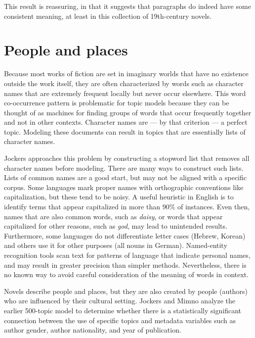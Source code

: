This result is reassuring, in that it suggests that paragraphs do indeed have some consistent meaning, at least in this collection of 19th-century novels.


\section{People and places}

Because most works of fiction are set in imaginary worlds that have no existence outside the work itself, they are often characterized by words such as character names that are extremely frequent locally but never occur elsewhere. 
This word co-occurrence pattern is problematic for topic models because they can be thought of as machines for finding groups of words that occur frequently together and not in other contexts.
Character names are --- by that criterion --- a perfect topic.
Modeling these documents can result in topics that are essentially lists of character names.

Jockers \cite{jockers-13} approaches this problem by constructing a stopword list that removes all character names before modeling.
There are many ways to construct such lists.
Lists of common names are a good start, but may not be aligned with a specific corpus.
Some languages mark proper names with orthographic conventions like capitalization, but these tend to be noisy.
A useful heuristic in English is to identify terms that appear capitalized in more than 90\% of instances.
Even then, names that are also common words, such as {\em daisy}, or words that appear capitalized for other reasons, such as {\em god}, may lead to unintended results.
Furthermore, some languages do not differentiate letter cases (Hebrew, Korean) and others use it for other purposes (all nouns in German).
Named-entity recognition tools scan text for patterns of language that indicate personal names, and may result in greater precision than simpler methods.
Nevertheless, there is no known way to avoid careful consideration of the meaning of words in context.

Novels describe people and places, but they are also created by people (authors) who are influenced by their cultural setting.
Jockers and Mimno \citep{jockers-13b} analyze the earlier 500-topic model to determine whether there is a statistically significant connection between the use of specific topics and metadata variables such as author gender, author nationality, and year of publication.

